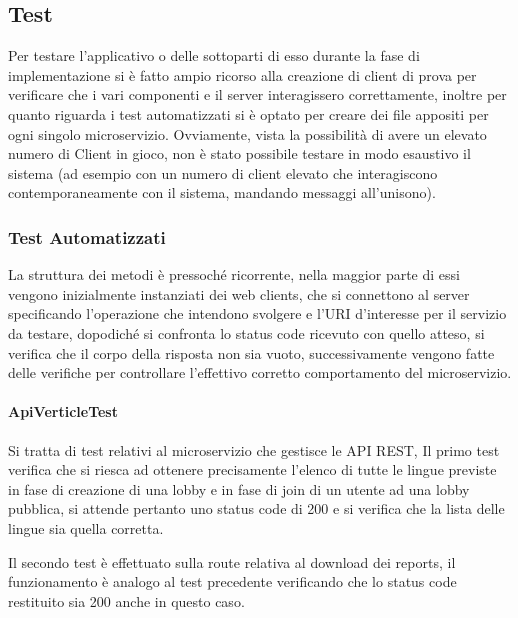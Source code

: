 \subsection{Test}
Per testare l'applicativo o delle sottoparti di esso durante la fase di implementazione si è fatto ampio ricorso alla creazione di client di prova per verificare che i vari componenti e il server interagissero correttamente, inoltre per quanto riguarda i test automatizzati si è optato per creare dei file appositi per ogni singolo microservizio. Ovviamente, vista la possibilità di avere un elevato numero di Client in gioco, non è stato possibile testare in modo esaustivo il sistema (ad esempio con un numero di client elevato che interagiscono contemporaneamente con il sistema, mandando messaggi all'unisono).

\subsubsection{Test Automatizzati}
 La struttura dei metodi è pressoché ricorrente, nella maggior parte di essi vengono inizialmente instanziati dei web clients, che si connettono al server specificando l'operazione che intendono svolgere e l'URI d'interesse per il servizio da testare, dopodiché si confronta lo status code ricevuto con quello atteso, si verifica che il corpo della risposta non sia vuoto, successivamente vengono fatte delle verifiche per controllare l'effettivo corretto comportamento del microservizio.

\paragraph{ApiVerticleTest}
Si tratta di test relativi al microservizio che gestisce le API REST, Il primo test verifica che si riesca ad ottenere precisamente l'elenco di tutte le lingue previste in fase di creazione di una lobby e in fase di join di un utente ad una lobby pubblica, si attende pertanto uno status code di 200 e si verifica che la lista delle lingue sia quella corretta. \newline

\noindent Il secondo test è effettuato sulla route relativa al download dei reports, il funzionamento è analogo al test precedente verificando che lo status code restituito sia 200 anche in questo caso. \newline

